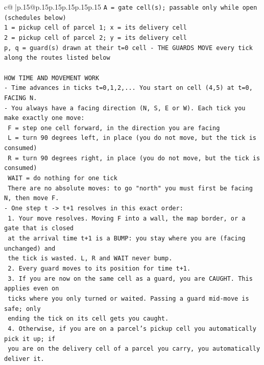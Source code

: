 \documentclass{article}
\begin{document}
{\begin{supertabular}{c@{$\;$}|p{.15\linewidth}@{}p{.15\linewidth}p{.15\linewidth}p{.15\linewidth}p{.15\linewidth}p{.15\linewidth}}
{{{\texttt{A = gate cell(s); passable only while open (schedules below)} \\
\texttt{1 = pickup cell of parcel 1; x = its delivery cell} \\
\texttt{2 = pickup cell of parcel 2; y = its delivery cell} \\
\texttt{p, q = guard(s) drawn at their t=0 cell {-} THE GUARDS MOVE every tick along the routes listed below} \\
\\ 
\texttt{HOW TIME AND MOVEMENT WORK} \\
\texttt{{-} Time advances in ticks t=0,1,2,... You start on cell (4,5) at t=0, FACING N.} \\
\texttt{{-} You always have a facing direction (N, S, E or W). Each tick you make exactly one move:} \\
\texttt{  F    = step one cell forward, in the direction you are facing} \\
\texttt{  L    = turn 90 degrees left, in place (you do not move, but the tick is consumed)} \\
\texttt{  R    = turn 90 degrees right, in place (you do not move, but the tick is consumed)} \\
\texttt{  WAIT = do nothing for one tick} \\
\texttt{  There are no absolute moves: to go "north" you must first be facing N, then move F.} \\
\texttt{{-} One step t {-}> t+1 resolves in this exact order:} \\
\texttt{  1. Your move resolves. Moving F into a wall, the map border, or a gate that is closed} \\
\texttt{     at the arrival time t+1 is a BUMP: you stay where you are (facing unchanged) and} \\
\texttt{     the tick is wasted. L, R and WAIT never bump.} \\
\texttt{  2. Every guard moves to its position for time t+1.} \\
\texttt{  3. If you are now on the same cell as a guard, you are CAUGHT. This applies even on} \\
\texttt{     ticks where you only turned or waited. Passing a guard mid{-}move is safe; only} \\
\texttt{     ending the tick on its cell gets you caught.} \\
\texttt{  4. Otherwise, if you are on a parcel's pickup cell you automatically pick it up; if} \\
\texttt{     you are on the delivery cell of a parcel you carry, you automatically deliver it.} \\
}}}
\end{supertabular}}
\end{document}
